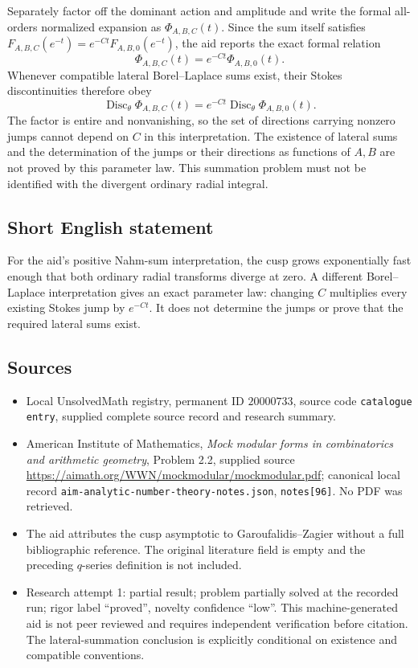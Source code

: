 \documentclass[11pt]{article}
\begin{document}
Separately factor off the dominant action and amplitude and write the formal all-orders normalized expansion as $\Phi_{A,B,C}(t)$. Since the sum itself satisfies $F_{A,B,C}(e^{-t})=e^{-Ct}F_{A,B,0}(e^{-t})$, the aid reports the exact formal relation
\[
 \Phi_{A,B,C}(t)=e^{-Ct}\Phi_{A,B,0}(t).
\]
Whenever compatible lateral Borel--Laplace sums exist, their Stokes discontinuities therefore obey
\[
 \operatorname{Disc}_\theta\Phi_{A,B,C}(t)
 =e^{-Ct}\operatorname{Disc}_\theta\Phi_{A,B,0}(t).
\]
The factor is entire and nonvanishing, so the set of directions carrying nonzero jumps cannot depend on $C$ in this interpretation. The existence of lateral sums and the determination of the jumps or their directions as functions of $A,B$ are not proved by this parameter law. This summation problem must not be identified with the divergent ordinary radial integral.
\subsection{Short English statement}
For the aid's positive Nahm-sum interpretation, the cusp grows exponentially fast enough that both ordinary radial transforms diverge at zero. A different Borel--Laplace interpretation gives an exact parameter law: changing $C$ multiplies every existing Stokes jump by $e^{-Ct}$. It does not determine the jumps or prove that the required lateral sums exist.
\subsection{Sources}
\begin{itemize}
\item Local UnsolvedMath registry, permanent ID $20000733$, source code \texttt{catalogue entry}, supplied complete source record and research summary.
\item American Institute of Mathematics, \emph{Mock modular forms in combinatorics and arithmetic geometry}, Problem 2.2, supplied source \url{https://aimath.org/WWN/mockmodular/mockmodular.pdf}; canonical local record \texttt{aim-analytic-number-theory-notes.json}, \texttt{notes[96]}. No PDF was retrieved.
\item The aid attributes the cusp asymptotic to Garoufalidis--Zagier without a full bibliographic reference. The original literature field is empty and the preceding $q$-series definition is not included.
\item Research attempt 1: partial result; problem partially solved at the recorded run; rigor label ``proved'', novelty confidence ``low''. This machine-generated aid is not peer reviewed and requires independent verification before citation. The lateral-summation conclusion is explicitly conditional on existence and compatible conventions.
\end{itemize}
\end{document}
